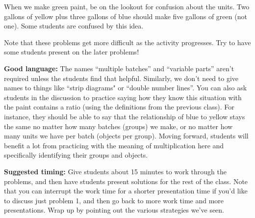 \documentclass[nooutcomes,noauthor,handout]{ximera}
\begin{document}
\begin{instructorNotes}
When we make green paint, be on the lookout for confusion about the units. Two gallons of yellow plus three gallons of blue should make five gallons of green (not one). Some students are confused by this idea.

Note that these problems get more difficult as the activity progresses. Try to have some students present on the later problems!


{\bf Good language:} The names ``multiple batches'' and ``variable parts'' aren't required unless the students find that helpful. Similarly, we don't need to give names to things like ``strip diagrams" or ``double number lines''.  You can also ask students in the discussion to practice saying how they know this situation with the paint contains a ratio (using the definitions from the previous class). For instance, they should be able to say that the relationship of blue to yellow stays the same no matter how many batches (groups) we make, or no matter how many units we have per batch (objects per group).  Moving forward, students will benefit a lot from practicing with the meaning of multiplication here and specifically identifying their groups and objects. 

{\bf Suggested timing:} Give students about 15 minutes to work through the problems, and then have students present solutions for the rest of the class.  Note that you can interrupt the work time for a shorter presentation time if you'd like to discuss just problem 1, and then go back to more work time and more presentations. Wrap up by pointing out the various strategies we've seen.
\end{instructorNotes}
\end{document}
